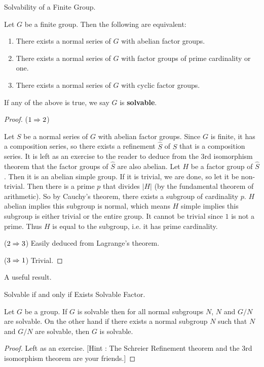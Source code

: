 \documentclass[../../book.tex]{subfiles}
\begin{document}
\begin{dfn} Solvability of a Finite Group.
    
    Let $G$ be a finite group.
    Then the following are equivalent: \begin{enumerate}
        \item There exists a normal series of $G$ with abelian factor groups.
        \item There exists a normal series of $G$ 
        with factor groups of prime cardinality or one.
        \item There exists a normal series of $G$ with cyclic factor groups.
    \end{enumerate}
    If any of the above is true, we say $G$ is \textbf{solvable}. 
    
\end{dfn}
\begin{proof}
    
    ($1 \Rightarrow 2$)
        
        Let $S$ be a normal series of $G$ with abelian factor groups.
        Since $G$ is finite, it has a composition series,
        so there exists a refinement $\hat{S}$ of $S$ that is a composition series.
        It is left as an exercise to the reader 
        to deduce from the 3rd isomorphism theorem
        that the factor groups of $\hat{S}$ are also abelian.
        Let $H$ be a factor group of $\hat{S}$. 
        Then it is an abelian simple group. 
        If it is trivial, we are done, so let it be non-trivial.
        Then there is a prime $p$ that divides $|H|$ 
        (by the fundamental theorem of arithmetic).
        So by Cauchy's theorem, there exists a subgroup of cardinality $p$.
        $H$ abelian implies this subgroup is normal, which means
        $H$ simple implies this subgroup is either trivial or the entire group.
        It cannot be trivial since $1$ is not a prime.
        Thus $H$ is equal to the subgroup, i.e. it has prime cardinality. 
        
    ($2 \Rightarrow 3$) Easily deduced from Lagrange's theorem.
    
    ($3 \Rightarrow 1$) Trivial.
\end{proof}
A useful result.
\begin{lem} Solvable if and only if Exists Solvable Factor.
    
    Let $G$ be a group.
    If $G$ is solvable then for all normal subgroups $N$,
    $N$ and $G / N$ are solvable.
    On the other hand if there exists a normal subgroup $N$ such that 
    $N$ and $G / N$ are solvable,
    then $G$ is solvable.
    
\end{lem}
\begin{proof}
    
    Left as an exercise. 
    [Hint : The Schreier Refinement theorem
    and the 3rd isomorphism theorem are your friends.]
    
\end{proof}
\end{document}
